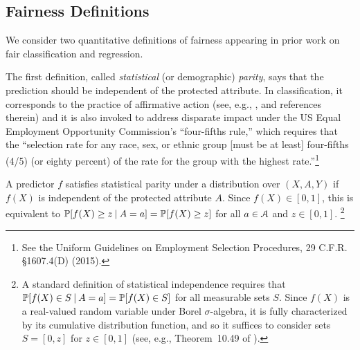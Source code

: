 \documentclass{article}
\begin{document}
\subsection{Fairness Definitions}
\label{sec:defs}

%

We consider two quantitative definitions of fairness appearing in prior work on fair classification and regression.

The first definition, called \emph{statistical} (or demographic) \emph{parity},
says that the prediction should be independent of the protected attribute. In classification, it corresponds to the practice of affirmative action
(see, e.g., \citealp{HolzerNe06}, and references therein) and it is also invoked to address disparate impact under the US Equal Employment Opportunity Commission's ``four-fifths rule,'' which requires that the ``selection rate for any race, sex, or ethnic group [must be at least] four-fifths (4/5) (or eighty percent) of the rate for the group with the highest rate.''\footnote{See the Uniform Guidelines on Employment Selection Procedures, 29 C.F.R. \S 1607.4(D) (2015).}
%
%
\begin{definition}
A predictor $f$ satisfies statistical parity under a distribution over $(X,A,Y)$ if $f(X)$ is independent of the protected attribute $A$. Since $f(X)\in[0,1]$, this is equivalent to $\mathbb{P}[f(X)\ge z\mathbin{\vert} A=a]=\mathbb{P}[f(X)\ge z]$ for all $a\in\mathcal{A}$ and $z\in[0,1]$.%
\footnote{%
A standard definition of statistical independence requires that $\mathbb{P}[f(X)\in S\mathbin{\vert} A=a]=\mathbb{P}[f(X)\in S]$ for all measurable sets $S$.
Since $f(X)$ is a real-valued random variable under Borel $\sigma$-algebra, it is fully characterized by its cumulative distribution function, and
so it suffices to consider sets $S=[0,z]$ for $z\in[0,1]$ (see, e.g., Theorem~10.49 of \mbox{\citealp{aliprantis2006infinite}}).}
\label{defn:dp}
\end{definition}
\end{document}
